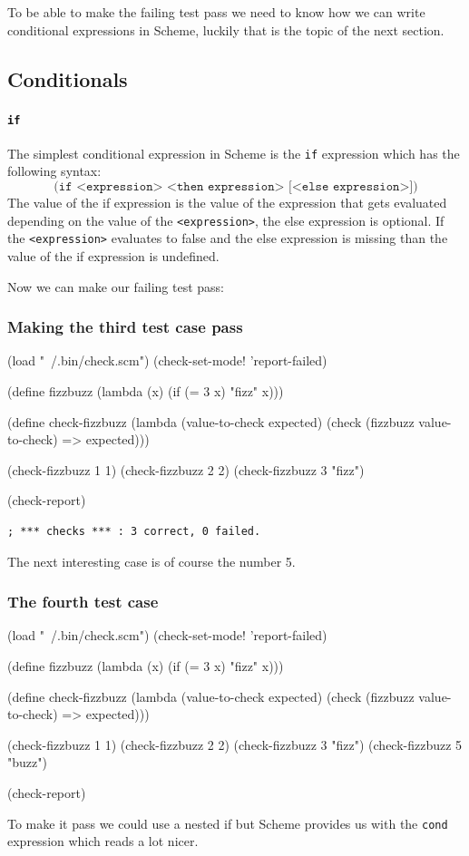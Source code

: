 \documentclass[12pt,a4paper,english,twoside]{article}
\begin{document}
To be able to make the failing test pass we need to know how we can write 
conditional expressions in Scheme, luckily that is the topic of the next 
section.

\subsection{Conditionals}
\paragraph{\texttt{if}}
The simplest conditional expression in Scheme is the \texttt{if} expression 
which
has the following syntax:
\begin{equation*}
    \texttt{(if <expression> <then expression> [<else expression>])}
\end{equation*}
The value of the if expression is the value of the expression that gets 
evaluated depending on the value of the \texttt{<expression>}, the else 
expression is optional. If the \texttt{<expression>} evaluates to false and 
the else expression is missing than the value of the if expression is 
undefined.

Now we can make our failing test pass:
\subsubsection{Making the third test case pass}
\begin{schemecode}
(load "~/.bin/check.scm")
(check-set-mode! 'report-failed)

(define fizzbuzz 
  (lambda (x) 
    (if (= 3 x) "fizz" x)))

(define check-fizzbuzz 
  (lambda (value-to-check expected)
    (check (fizzbuzz value-to-check) => expected)))

(check-fizzbuzz 1 1)
(check-fizzbuzz 2 2)
(check-fizzbuzz 3 "fizz")

(check-report)
\end{schemecode}
\begin{lstlisting}
; *** checks *** : 3 correct, 0 failed.
\end{lstlisting}
The next interesting case is of course the number 5.  
\subsubsection{The fourth test case}
\begin{schemecode}
(load "~/.bin/check.scm")
(check-set-mode! 'report-failed)

(define fizzbuzz 
  (lambda (x) 
    (if (= 3 x) "fizz" x)))

(define check-fizzbuzz 
  (lambda (value-to-check expected)
    (check (fizzbuzz value-to-check) => expected)))

(check-fizzbuzz 1 1)
(check-fizzbuzz 2 2)
(check-fizzbuzz 3 "fizz")
(check-fizzbuzz 5 "buzz")

(check-report)
\end{schemecode}
To make it pass we could use a nested if but Scheme provides us with the 
\texttt{cond} expression which reads a lot nicer.
\end{document}
